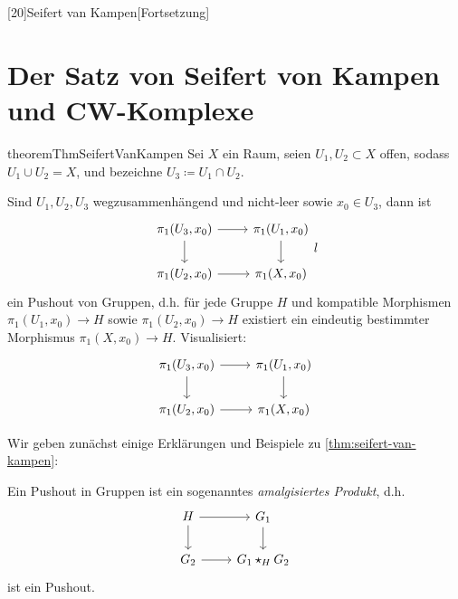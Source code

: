 
[20]{Seifert van Kampen}[Fortsetzung]

\section{Der Satz von Seifert von Kampen und CW-Komplexe}\label{sec:seifert-van-kampen}

\begin{restatable}{theorem}{ThmSeifertVanKampen}\label{thm:seifert-van-kampen}
    Sei $X$ ein Raum, seien  $U_1,U_2\subset X$ offen, sodass $U_1\cup U_2 = X$, und bezeichne  $U_3 \coloneqq  U_1 \cap U_2$.

    Sind $U_1,U_2,U_3$ wegzusammenhängend und nicht-leer sowie $x_0\in U_3$, dann ist
    \[
        \begin{tikzcd}[ampersand replacement = \&]
        \pi_1(U_3,x_0) \ar[swap]{d}{} \ar{r}{} \& \pi_1(U_1,x_0) \ar{d}{} \\
        \pi_1(U_2,x_0) \ar[swap]{r}{} \& \pi_1(X,x_0)
    \end{tikzcd}
    l\]
    ein Pushout von Gruppen, d.h. für jede Gruppe $H$ und kompatible Morphismen  $\pi_1(U_1,x_0) \to  H$ sowie $\pi_1(U_2,x_0) \to  H$ existiert ein eindeutig bestimmter Morphismus $\pi_1(X,x_0) \to  H$. Visualisiert:
    \[
        \begin{tikzcd}[ampersand replacement = \&]
        \pi_1(U_3,x_0) \ar[swap]{d}{} \ar{r}{} \& \pi_1(U_1,x_0) \ar{d}{} \\
        \pi_1(U_2,x_0) \ar[swap]{r}{} \& \pi_1(X,x_0)
    \end{tikzcd}
    \]
\end{restatable}



Wir geben zunächst einige Erklärungen und Beispiele zu \autoref{thm:seifert-van-kampen}:

\begin{remark}
    Ein Pushout in Gruppen ist ein sogenanntes \textit{amalgisiertes Produkt}, d.h.
    \[
    \begin{tikzcd}
        H \ar[swap]{d}{} \ar{r}{} & G_1 \ar{d}{} \\
        G_2 \ar[swap]{r}{} & G_1 \star_H G_2
    \end{tikzcd}
    \]
    ist ein Pushout.
\end{remark}

